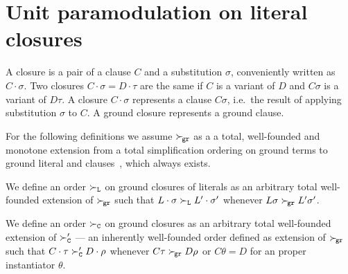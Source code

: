 \section{Unit paramodulation on literal closures}\label{sec:unit:paramodulation:closures}

\begin{definition}
    A closure is a pair of a clause \( C \) and a substitution \( \sigma \),
    conveniently written as \( C\cdot\sigma \). Two closures \( C\cdot\sigma = D\cdot\tau \)
    are the same if \( C \) is a variant of \( D \) and \( C\sigma \) is a variant of \( D\tau \).
    A closure \( C\cdot\sigma \) represents a clause \( C\sigma \),
    i.e.~the result of applying substitution \( \sigma \) to \( C \).
    A ground closure represents a ground clause.
\end{definition}

For the following definitions we assume
\( \mathrel\succ_{\!\mathtt{gr}} \) as a a total, well-founded and monotone extension
from a total simplification ordering on ground terms
to ground literal and clauses~\cite{NR2001},
which always exists.


\begin{definition}
    We define an order \( \mathrel\succ_{\mathtt{L}} \) on ground closures of literals
    as an arbitrary total well-founded extension of \( \mathrel\succ_{\!\mathtt{gr}} \)
    such that
    \( L\cdot\sigma\mathrel\succ_{\mathtt{L}} L'\cdot\sigma' \) whenever
    \( L\sigma\mathrel\succ_{\!\mathtt{gr}} L'\sigma' \).

    We define an order \( \mathrel\succ_{\mathtt{C}} \) on ground closures
    as an arbitrary total well-founded extension of
    \( \mathrel\succ_{\mathtt{C}}' \) --- an inherently well-founded order defined as extension of \( \mathrel\succ_{\!\mathtt{gr}} \)
    such that
    \( C\cdot\tau\mathrel\succ_{\mathtt{C}}' D\cdot\rho \) whenever
    \( C\tau\mathrel\succ_{\!\mathtt{gr}} D\rho \) or \( C\theta = D \) for an proper instantiator \( \theta \).
\end{definition}

